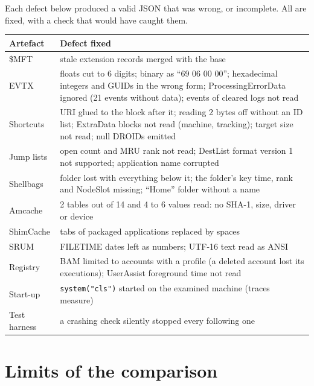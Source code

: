 \documentclass[11pt,a4paper,oneside]{report}
\begin{document}
Each defect below produced a valid JSON that was wrong, or incomplete. All are
fixed, with a check that would have caught them.

\begin{longtable}{@{}L{3.0cm}L{12.0cm}@{}}
\toprule
\textbf{Artefact} & \textbf{Defect fixed} \\
\midrule\endhead
\$MFT & stale extension records merged with the base \\
EVTX & floats cut to 6 digits; binary as ``69 06 00 00''; hexadecimal integers and GUIDs in the wrong form; ProcessingErrorData ignored (21 events without data); events of cleared logs not read \\
Shortcuts & URI glued to the block after it; reading 2 bytes off without an ID list; ExtraData blocks not read (machine, tracking); target size not read; null DROIDs emitted \\
Jump lists & open count and MRU rank not read; DestList format version 1 not supported; application name corrupted \\
Shellbags & folder lost with everything below it; the folder's key time, rank and NodeSlot missing; ``Home'' folder without a name \\
Amcache & 2 tables out of 14 and 4 to 6 values read: no SHA-1, size, driver or device \\
ShimCache & tabs of packaged applications replaced by spaces \\
SRUM & FILETIME dates left as numbers; UTF-16 text read as ANSI \\
Registry & BAM limited to accounts with a profile (a deleted account lost its executions); UserAssist foreground time not read \\
Start-up & \texttt{system("cls")} started  on the examined machine (traces measure) \\
Test harness & a crashing check silently stopped every following one \\
\bottomrule
\end{longtable}

\chapter{Limits of the comparison}
\end{document}
